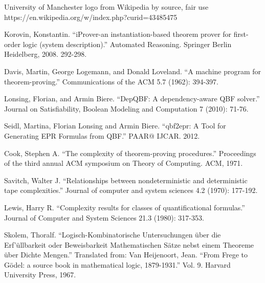 \begin{thebibliography}{11}

University of Manchester logo from Wikipedia by source, fair use\newline
https://en.wikipedia.org/w/index.php?curid=43485475

Korovin, Konstantin. ``iProver-an instantiation-based theorem prover for first-order logic (system description).'' Automated Reasoning. Springer Berlin Heidelberg, 2008. 292-298.

Davis, Martin, George Logemann, and Donald Loveland. ``A machine program for theorem-proving.'' Communications of the ACM 5.7 (1962): 394-397.

Lonsing, Florian, and Armin Biere. ``DepQBF: A dependency-aware QBF solver.'' Journal on Satisfiability, Boolean Modeling and Computation 7 (2010): 71-76.

Seidl, Martina, Florian Lonsing and Armin Biere. ``qbf2epr: A Tool for Generating EPR Formulas from QBF.'' PAAR@ IJCAR. 2012.
  
Cook, Stephen A. ``The complexity of theorem-proving procedures.'' Proceedings of the third annual ACM symposium on Theory of Computing. ACM, 1971.

Savitch, Walter J. ``Relationships between nondeterministic and deterministic tape complexities.'' Journal of computer and system sciences 4.2 (1970): 177-192.

Lewis, Harry R. ``Complexity results for classes of quantificational formulas.'' Journal of Computer and System Sciences 21.3 (1980): 317-353.

Skolem, Thoralf. ``Logisch-Kombinatorische Untersuchungen {\"u}ber die Erf'{\"u}llbarkeit oder Beweisbarkeit Mathematischen S{\"a}tze nebst einem Theoreme {\"u}ber Dichte Mengen.'' Translated from: Van Heijenoort, Jean. ``From Frege to G{\"o}del: a source book in mathematical logic, 1879-1931.'' Vol. 9. Harvard University Press, 1967.

\end{thebibliography}
